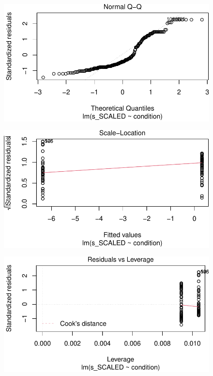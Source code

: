 \documentclass[
  letterpaper,
  DIV=11,
  numbers=noendperiod]{scrreprt}
\begin{document}
\begin{figure}[H]

{\centering \includegraphics{analysis/SGC3A/5_sgc3A_exploration_files/figure-pdf/unnamed-chunk-10-2.pdf}

}

\end{figure}

\begin{figure}[H]

{\centering \includegraphics{analysis/SGC3A/5_sgc3A_exploration_files/figure-pdf/unnamed-chunk-10-3.pdf}

}

\end{figure}

\begin{figure}[H]

{\centering \includegraphics{analysis/SGC3A/5_sgc3A_exploration_files/figure-pdf/unnamed-chunk-10-4.pdf}

}

\end{figure}
\end{document}

